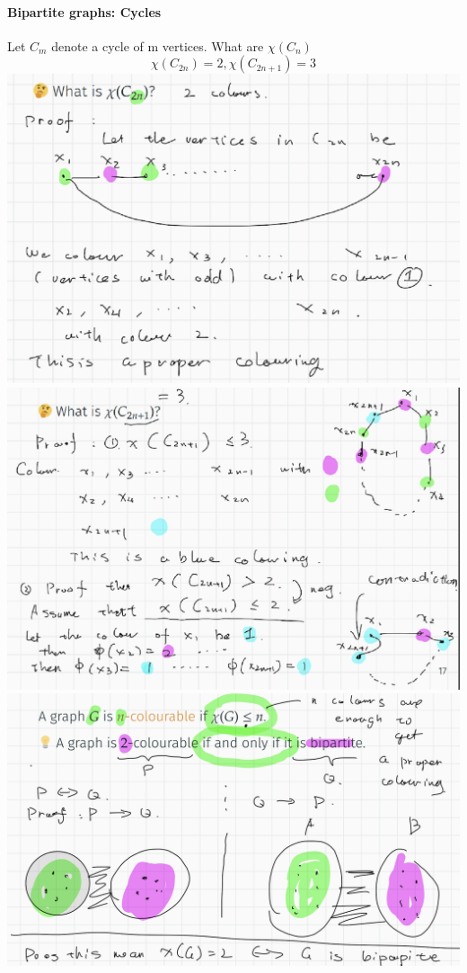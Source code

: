 \documentclass{article}
\begin{document}
\paragraph{Bipartite graphs: Cycles}
Let $C_m$ denote a cycle of m vertices. What are $\chi (C_n)$
$$\chi (C_{2n})=2, \chi (C_{2n+1})=3$$
\includegraphics{0080}\newline
\includegraphics{0081}\newline
\includegraphics{0082}\newline
\end{document}
